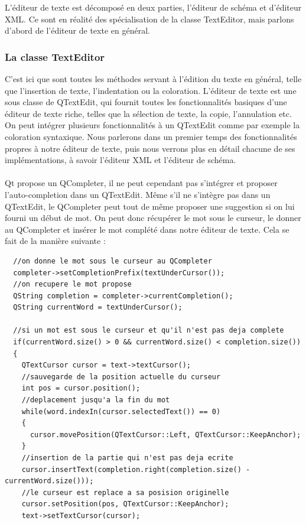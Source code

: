 L'éditeur de texte est décomposé en deux parties, l'éditeur de schéma et d'éditeur XML. Ce sont en réalité des spécialisation de la classe TextEditor, mais parlons d'abord de l'éditeur de texte en général.
\subsubsection{La classe TextEditor}
C'est ici que sont toutes les méthodes servant à l'édition du texte en général, telle que l'insertion de texte, l'indentation ou la coloration. L'éditeur de texte est une sous classe de QTextEdit, qui fournit toutes les fonctionnalités basiques d'une éditeur de texte riche, telles que la sélection de texte, la copie, l'annulation etc. On peut intégrer plusieurs fonctionnalités à un QTextEdit comme par exemple la coloration syntaxique. Nous parlerons dans un premier temps des fonctionnalités propres à notre éditeur de texte, puis nous verrons plus en détail chacune de ses implémentations, à savoir l'éditeur XML et l'éditeur de schéma.

\paragraph{}
Qt propose un QCompleter, il ne peut cependant pas s'intégrer et proposer l'auto-completion dans un QTextEdit. Même s'il ne s'intègre pas dans un QTextEdit, le QCompleter peut tout de même proposer une suggestion si on lui fourni un début de mot. On peut donc récupérer le mot sous le curseur, le donner au QCompleter et insérer le mot complété dans notre éditeur de texte. Cela se fait de la manière suivante :

\begin{lstlisting}
  //on donne le mot sous le curseur au QCompleter
  completer->setCompletionPrefix(textUnderCursor());
  //on recupere le mot propose
  QString completion = completer->currentCompletion();
  QString currentWord = textUnderCursor();

  //si un mot est sous le curseur et qu'il n'est pas deja complete
  if(currentWord.size() > 0 && currentWord.size() < completion.size())
  {
    QTextCursor cursor = text->textCursor();
    //sauvegarde de la position actuelle du curseur
    int pos = cursor.position();
    //deplacement jusqu'a la fin du mot
    while(word.indexIn(cursor.selectedText()) == 0)
    {
      cursor.movePosition(QTextCursor::Left, QTextCursor::KeepAnchor);
    }
    //insertion de la partie qui n'est pas deja ecrite
    cursor.insertText(completion.right(completion.size() - currentWord.size()));
    //le curseur est replace a sa posision originelle
    cursor.setPosition(pos, QTextCursor::KeepAnchor);
    text->setTextCursor(cursor);
\end{lstlisting}
